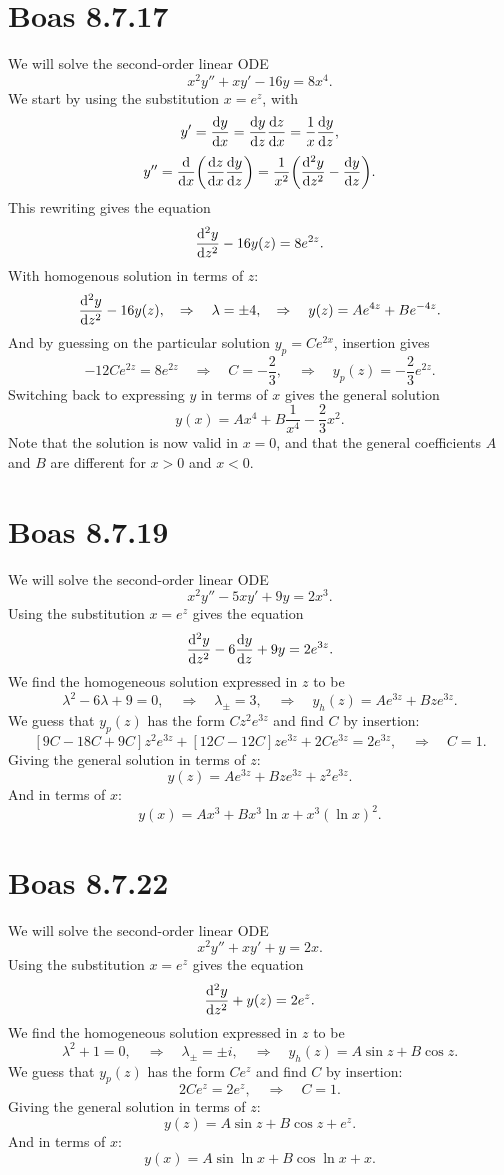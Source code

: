 \documentclass[a4paper, 11pt, titlepage, english]{article}
\renewcommand{\d}{{\rm d}}
\newcommand{\To}{\quad\Rightarrow\quad}
\begin{document}
\section*{Boas 8.7.17}
We will solve the second-order linear ODE
$$x^2y'' + xy' - 16y = 8x^4.$$
We start by using the substitution $x = e^z$, with
$$y' = \frac{\d y}{\d x} = \frac{\d y}{\d z} \frac{\d z}{\d x} = \frac{1}{x}\frac{\d y}{\d z},$$
$$y'' = \frac{\d }{\d x}\bigg(\frac{\d z}{\d x} \frac{\d y}{\d z}\bigg) = \frac{1}{x^2}\bigg(\frac{\d^2 y}{\d z^2} - \frac{\d y}{\d z}\bigg).$$
This rewriting gives the equation
$$\frac{\d^2 y}{\d z^2}  - 16y(z) = 8e^{2z}.$$
With homogenous solution in terms of $z$:
$$\frac{\d^2 y}{\d z^2}  - 16y(z), \quad \Rightarrow \quad \lambda = \pm 4, \quad \Rightarrow \quad y(z) = Ae^{4z} + Be^{-4z}.$$
And by guessing on the particular solution $y_p = Ce^{2x}$, insertion gives
$$-12Ce^{2z} = 8e^{2z} \quad \Rightarrow \quad  C = -\frac{2}{3}, \quad \Rightarrow \quad y_p(z) = -\frac{2}{3}e^{2z}. $$
Switching back to expressing $y$ in terms of $x$ gives the general solution
$$y(x) = Ax^4 + B\frac{1}{x^4} - \frac{2}{3}{x^2}.$$
Note that the solution is now valid in $x=0$, and that the general coefficients $A$ and $B$ are different for $x>0$ and $x<0$.

\clearpage

\section*{Boas 8.7.19}
We will solve the second-order linear ODE
$$x^2y'' - 5xy' + 9y = 2x^3.$$
Using the substitution $x=e^z$ gives the equation
$$\frac{\d^2 y}{\d z^2} - 6\frac{\d y}{\d z} + 9y = 2e^{3z}.$$
We find the homogeneous solution expressed in $z$ to be
$$\lambda^2 - 6\lambda + 9 = 0, \To \lambda_\pm = 3, \To y_h(z) = Ae^{3z} + Bze^{3z}.$$
We guess that $y_p(z)$ has the form $Cz^2e^{3z}$ and find $C$ by insertion:
$$[9C-18C+9C]z^2e^{3z} + [12C-12C]ze^{3z} + 2Ce^{3z} = 2e^{3z}, \To C = 1.$$
Giving the general solution in terms of $z$:
$$y(z) = Ae^{3z} + Bze^{3z} + z^2e^{3z}.$$
And in terms of $x$:
$$y(x) = Ax^3 + Bx^3\ln x  + x^3(\ln x)^2.$$


\section*{Boas 8.7.22}

We will solve the second-order linear ODE
$$x^2y'' + xy' + y = 2x.$$
Using the substitution $x=e^z$ gives the equation
$$\frac{\d^2 y}{\d z^2} + y(z) = 2e^{z}.$$
We find the homogeneous solution expressed in $z$ to be
$$\lambda^2 + 1 = 0, \To \lambda_\pm = \pm i, \To y_h(z) = A\sin z + B \cos z.$$
We guess that $y_p(z)$ has the form $Ce^{z}$ and find $C$ by insertion:
$$2Ce^{z} = 2e^{z}, \To C = 1.$$
Giving the general solution in terms of $z$:
$$y(z) = A\sin z + B \cos z + e^z.$$
And in terms of $x$:
$$y(x) = A\sin \ln x + B\cos \ln x  + x.$$
\end{document}
